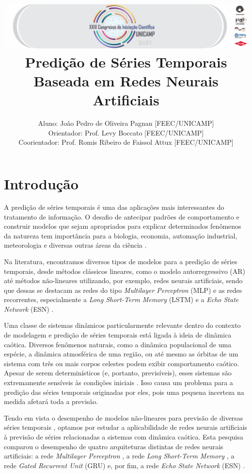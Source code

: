 \documentclass{article}
\title{{\noindent \includegraphics[scale = 0.5]{banner-grande.png}}\\ Predição de Séries Temporais Baseada em Redes Neurais
Artificiais}
\author{Aluno: João Pedro de Oliveira Pagnan [FEEC/UNICAMP]\\Orientador: Prof.  Levy Boccato [FEEC/UNICAMP]\\
Coorientador: Prof. Romis Ribeiro de Faissol Attux [FEEC/UNICAMP]}
\begin{document}

\section{Introdução}

A predição de séries temporais é uma das aplicações mais interessantes do tratamento de informação. O desafio de antecipar padrões de comportamento e construir modelos que sejam apropriados para explicar determinados fenômenos da natureza tem importância  para a biologia, economia, automação industrial, meteorologia e diversas outras áreas da ciência \cite{box2015time}.

Na literatura, encontramos diversos tipos de modelos para a  predição de séries temporais, desde métodos clássicos lineares, como o modelo autorregressivo (AR) \cite{box2015time} até métodos não-lineares utilizando, por exemplo, redes neurais artificiais, sendo que dessas se destacam as redes do tipo \textit{Multilayer Perceptron} (MLP) \cite{rosenblatt1958perceptron} e as redes recorrentes, especialmente a \textit{Long Short-Term Memory} (LSTM)  \cite{connor1994recurrent} e a \textit{Echo State Network} (ESN) \cite{jaeger2007echo}.

Uma classe de sistemas dinâmicos particularmente relevante dentro do contexto de modelagem e predição de séries temporais está ligada à ideia de dinâmica caótica. Diversos fenômenos naturais, como a dinâmica populacional de uma espécie, a dinâmica atmosférica de uma região, ou até mesmo as órbitas de um sistema com três ou mais corpos celestes podem exibir comportamento caótico. Apesar de serem determinísticos (e, portanto, previsíveis), esses sistemas são extremamente sensíveis às condições iniciais \cite{fiedler1994caos}. Isso causa um problema para a predição das séries temporais originadas por eles, pois uma pequena incerteza na medida afetará toda a previsão. 

Tendo em vista o desempenho de modelos não-lineares para previsão de diversas séries temporais \cite{connor1994recurrent}, optamos por estudar a aplicabilidade de redes neurais artificiais à previsão de séries relacionadas a sistemas com dinâmica caótica. Esta pesquisa comparou o desempenho de quatro arquiteturas distintas de redes neurais artificiais: a rede \textit{Multilayer Perceptron} \cite{rosenblatt1958perceptron}, a rede \textit{Long Short-Term Memory} \cite{connor1994recurrent}, a rede \textit{Gated Recurrent Unit} (GRU) \cite{cho2014learning} e, por fim, a rede \textit{Echo State Network} (ESN) \cite{jaeger2007echo}.
\end{document}
